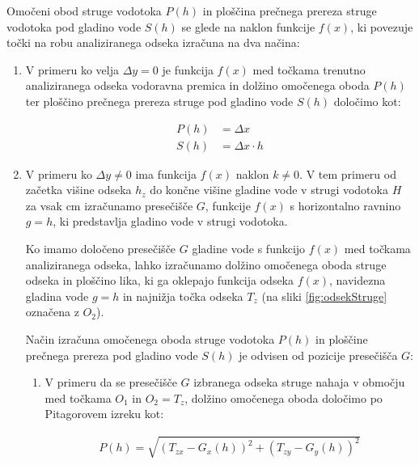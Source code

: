 Omočeni obod struge vodotoka $P(h)$ in ploščina prečnega prereza struge vodotoka pod gladino vode $S(h)$ se glede na naklon funkcije $f(x)$, ki povezuje točki na robu analiziranega odseka izračuna na dva načina:

\begin{enumerate}

\item V primeru ko velja $\Delta y = 0$ je funkcija $f(x)$ med točkama trenutno analiziranega odseka vodoravna premica in dolžino omočenega oboda $P(h)$ ter ploščino prečnega prereza struge pod gladino vode $S(h)$ določimo kot:

\begin{ceqn}
\begin{align}
P(h)&= \Delta x\\
S(h)&= \Delta x \cdot h
\end{align}
\end{ceqn}


\item V primeru ko $\Delta y \neq 0$ ima funkcija $f(x)$ naklon $k \neq 0$. V tem primeru od začetka višine odseka $h_z$ do končne višine gladine vode v strugi vodotoka $H$ za vsak cm izračunamo presečišče $G$, funkcije $f(x)$ s horizontalno ravnino $g = h$, ki predstavlja gladino vode v strugi vodotoka. 


Ko imamo določeno presečišče $G$ gladine vode s funkcijo $f(x)$ med točkama analiziranega odseka, lahko izračunamo dolžino omočenega oboda struge odseka in ploščino lika, ki ga oklepajo funkcija odseka $f(x)$, navidezna gladina vode $g = h$ in najnižja točka odseka $T_z$ (na sliki \ref{fig:odsekStruge} označena z $O_2$). 



Način izračuna omočenega oboda struge vodotoka $P(h)$ in ploščine prečnega prereza pod gladino vode $S(h)$ je odvisen od pozicije presečišča $G$:


\begin{enumerate}
	\item V primeru da se presečišče $G$ izbranega odseka struge nahaja v območju med točkama $O_1$ in $O_2 = T_z$, dolžino omočenega oboda določimo po Pitagorovem izreku kot:
	
	\begin{ceqn}
		\begin{align}
		P(h) = \sqrt{(T_{zx} - G_x(h))^{2} + (T_{zy} - G_y(h))^{2}}
		\end{align}
	\end{ceqn}
	

\end{enumerate}
\end{enumerate}

